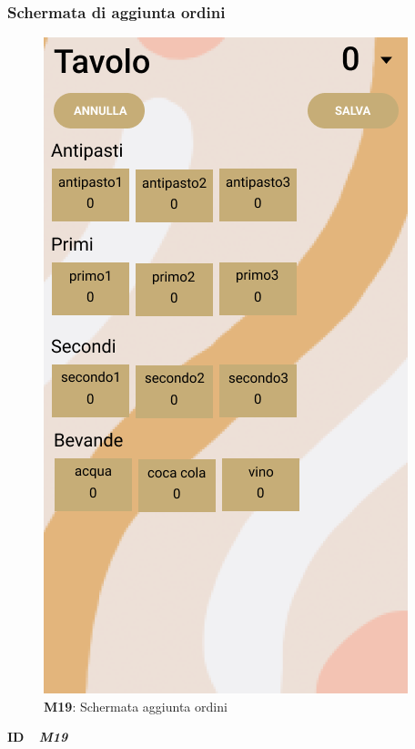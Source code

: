                     \subsubsection{Schermata di aggiunta ordini}
                          \begin{figure}[H]
                            \centering
                            \includegraphics[scale=0.4]{assets/diagrammi/Mockup/Mockup_AddOrder.png}
                            \caption*{\textbf{M19}: Schermata aggiunta ordini}\label{fig:Mockup_WaiterDash}
                          \end{figure}
                
                          \begin{flushleft}
                            \textbf{ID}   \ \Large{ \emph{\textbf{M19}}}
                          \end{flushleft}
                
